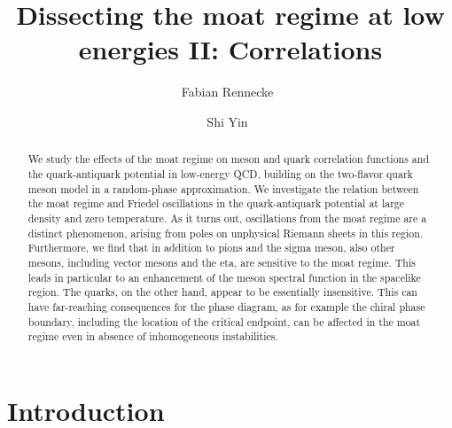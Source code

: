 \documentclass[reprint,english,superscriptaddress,preprintnumbers,amsmath,amssymb,aps,prd]{revtex4-2}
\newcommand{\gettitle}{Dissecting the moat regime at low energies II: Correlations}
\begin{document}
\title{\gettitle}

\author{Fabian Rennecke \,}

\author{Shi Yin \,}

\begin{abstract}

We study the effects of the moat regime on meson and quark correlation functions and the quark-antiquark potential in low-energy QCD, building on the two-flavor quark meson model in a random-phase approximation.
We investigate the relation between the moat regime and Friedel oscillations in the quark-antiquark potential at large density and zero temperature. As it turns out, oscillations from the moat regime are a distinct phenomenon, arising from poles on unphysical Riemann sheets in this region.
Furthermore, we find that in addition to pions and the sigma meson, also other mesons, including vector mesons and the eta, are sensitive to the moat regime. This leads in particular to an enhancement of the meson spectral function in the spacelike region. The quarks, on the other hand, appear to be essentially insensitive. This can have far-reaching consequences for the phase diagram, as for example the chiral phase boundary, including the location of the critical endpoint, can be affected in the moat regime even in absence of inhomogeneous instabilities.
\end{abstract}

\maketitle
	
\section{Introduction}
\end{document}
